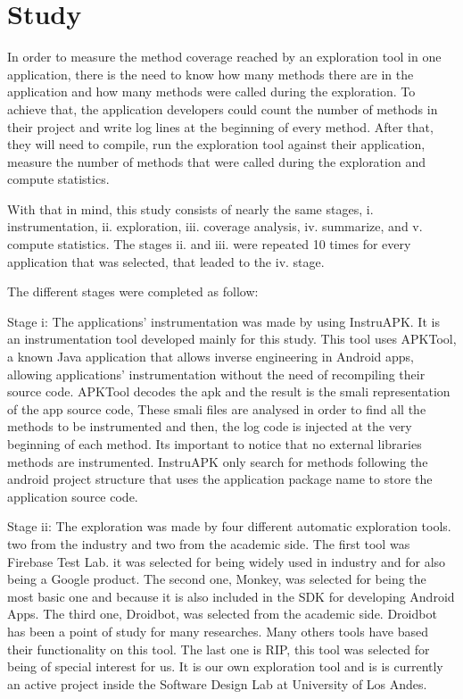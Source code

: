 \section{Study}
\label{sec:study}
In order to measure the method coverage reached by an exploration tool in one application, there is the need to know how many methods there are in the application and how many methods were called during the exploration. To achieve that, the application developers could count the number of methods in their project and write log lines at the beginning of every method. After that, they will need to compile, run the exploration tool against their application, measure the number of methods that were called during the exploration and compute statistics.

With that in mind, this study consists of nearly the same stages, i. instrumentation, ii. exploration, iii. coverage analysis, iv. summarize, and v. compute statistics. The stages ii. and iii. were repeated 10 times for every application that was selected, that leaded to the iv. stage.

The different stages were completed as follow:

Stage i: The applications' instrumentation was made by using InstruAPK. It is an instrumentation tool developed mainly for this study. This tool uses APKTool, a known Java application that allows inverse engineering in Android apps, allowing applications' instrumentation without the need of recompiling their source code. APKTool decodes the apk and the result is the smali representation of the app source code, These smali files are analysed in order to find all the methods to be instrumented and then, the log code is injected at the very beginning of each method. Its important to notice that no external libraries methods are instrumented. InstruAPK only search for methods following the android project structure that uses the application package name to store the application source code.

Stage ii: The exploration was made by four different automatic exploration tools. two from the industry and two from the academic side. The first tool was Firebase Test Lab. it was selected for being widely used in industry and for also being a Google product. The second one, Monkey, was selected for being the most basic one and because it is also included in the SDK for developing Android Apps. The third one, Droidbot, was selected from the academic side. Droidbot has been a point of study for many researches. Many others tools have based their functionality on this tool. The last one is RIP, this tool was selected for being of special interest for us. It is our own exploration tool and is is currently an active project inside the Software Design Lab at University of Los Andes. 

